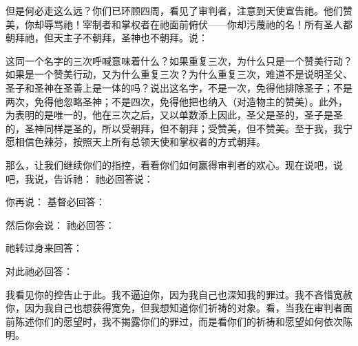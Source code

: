 但是何必走这么远？你们已环顾四周，看见了审判者，注意到天使宣告祂。他们赞美，你却辱骂祂！宰制者和掌权者在祂面前俯伏——你却污蔑祂的名！所有圣人都朝拜祂，但天主子不朝拜，圣神也不朝拜。说： \par

这同一个名字的三次呼喊意味着什么？如果重复三次，为什么只是一个赞美行动？如果是一个赞美行动，又为什么重复三次？为什么重复三次，难道不是说明圣父、圣子和圣神在圣善上是一体的吗？说出这名字，不是一次，免得他排除圣子；不是两次，免得他忽略圣神；不是四次，免得他把也纳入（对造物主的赞美）。此外，为表明的是唯一的，他在三次之后，又以单数添上因此，圣父是圣的，圣子是圣的，圣神同样是圣的，所以受朝拜，但不朝拜；受赞美，但不赞美。至于我，我宁愿相信色辣芬，按照天上所有总领天使和掌权者的方式朝拜。\par

\par

那么，让我们继续你们的指控，看看你们如何赢得审判者的欢心。现在说吧，说吧，我说，告诉祂： 祂必回答说：\par

你再说： 基督必回答：\par

然后你会说： 祂必回答：\par

 祂转过身来回答：\par

对此祂必回答：\par

我看见你的控告止于此。我不逼迫你，因为我自己也深知我的罪过。我不吝惜宽赦你，因为我自己也想获得宽免，但我想知道你们祈祷的对象。看，当我在审判者面前陈述你们的愿望时，我不揭露你们的罪过，而是看你们的祈祷和愿望如何依次陈明。\par

